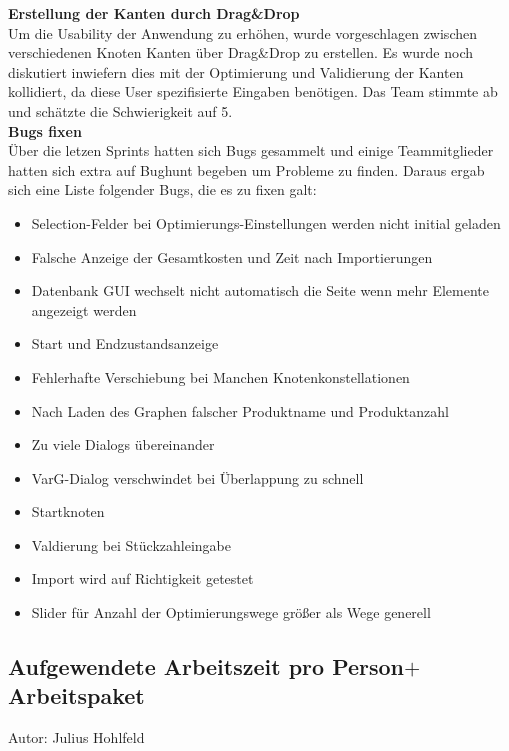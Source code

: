 \textbf{Erstellung der Kanten durch Drag\&Drop}\\
Um die Usability der Anwendung zu erhöhen, wurde vorgeschlagen zwischen verschiedenen Knoten Kanten über Drag\&Drop zu erstellen. Es wurde noch diskutiert inwiefern dies mit der Optimierung
und Validierung der Kanten kollidiert, da diese User spezifisierte Eingaben benötigen. Das Team stimmte ab und schätzte die Schwierigkeit auf 5.\\

\textbf{Bugs fixen}\\
Über die letzen Sprints hatten sich Bugs gesammelt und einige Teammitglieder hatten sich extra auf Bughunt begeben um Probleme zu finden. Daraus ergab sich eine Liste folgender Bugs, die es zu fixen galt:

\begin{itemize}
\item Selection-Felder bei Optimierungs-Einstellungen werden nicht initial geladen
\item Falsche Anzeige der Gesamtkosten und Zeit nach Importierungen
\item Datenbank GUI wechselt nicht automatisch die Seite wenn mehr Elemente angezeigt werden
\item Start und Endzustandsanzeige
\item Fehlerhafte Verschiebung bei Manchen Knotenkonstellationen
\item Nach Laden des Graphen falscher Produktname und Produktanzahl
\item Zu viele Dialogs übereinander
\item VarG-Dialog verschwindet bei Überlappung zu schnell
\item Startknoten
\item Valdierung bei Stückzahleingabe
\item Import wird auf Richtigkeit getestet
\item Slider für Anzahl der Optimierungswege größer als Wege generell
\end{itemize}

\subsection{Aufgewendete Arbeitszeit pro Person$+$Arbeitspaket}
{\small Autor: Julius Hohlfeld}

